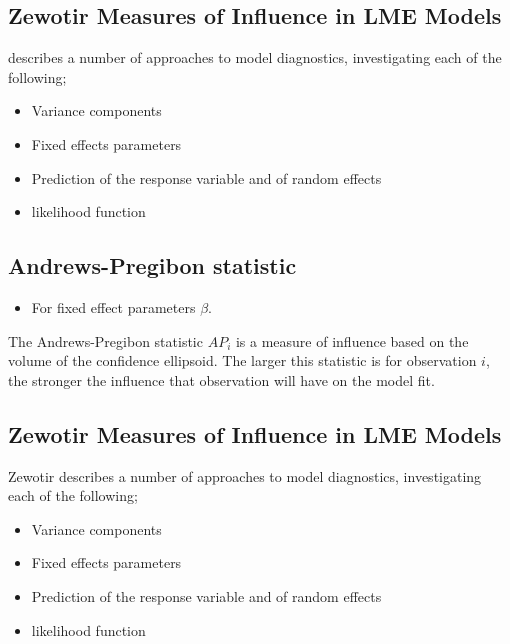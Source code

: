 \documentclass[Main.tex]{subfiles}
\begin{document}
	\subsection{Zewotir Measures of Influence in LME Models}%
	\citet{Zewotir} describes a number of approaches to model diagnostics, investigating each of the following;
	\begin{itemize}
		\item Variance components
		\item Fixed effects parameters
		\item Prediction of the response variable and of random effects
		\item likelihood function
	\end{itemize}
	

	
	\subsection{Andrews-Pregibon statistic} %
	\begin{itemize}
		\item For fixed effect parameters $\beta$.
	\end{itemize}
	The Andrews-Pregibon statistic $AP_{i}$ is a measure of influence based on the volume of the confidence ellipsoid.
	The larger this statistic is for observation $i$, the stronger the influence that observation will have on the model fit.


		
	
	
	
	\subsection{Zewotir Measures of Influence in LME Models}%
	Zewotir describes a number of approaches to model diagnostics, investigating each of the following;
	\begin{itemize}
		\item Variance components
		\item Fixed effects parameters
		\item Prediction of the response variable and of random effects
		\item likelihood function
	\end{itemize}
	
\end{document}
